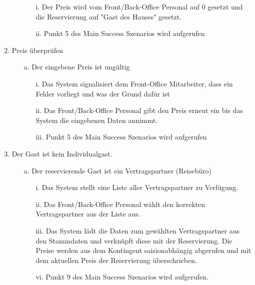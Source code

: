 \documentclass[./detailed_overview_usecases.tex]{subfiles}
\begin{document}
\begin{enumerate}
\begin{itemize}
                \begin{itemize}
                    \item[i.] Der Preis wird vom Front/Back-Office Personal auf 0 gesetzt und die Reservierung auf "Gast des Hauses" gesetzt.
                    \item[ii.] Punkt 5 des Main Success Szenarios wird aufgerufen
                \end{itemize}
            \end{itemize}
        \item Preis überprüfen
        \begin{itemize}
            \item[a.] Der eingebene Preis ist ungültig
            \begin{itemize}
                \item[i.] Das System signalisiert dem Front-Office Mitarbeiter, dass ein Fehler vorliegt und was der Grund dafür ist
                \item[ii.] Das Front/Back-Office Personal gibt den Preis erneut ein bis das System die eingebenen Daten annimmt.
                \item[iii.] Punkt 5 des Main Success Szenarios wird aufgerufen
            \end{itemize}
        \end{itemize}
        \setcounter{enumi}{7}
        \item Der Gast ist kein Individualgast.
        \begin{itemize}
            \item[a.] Der reservierende Gast ist ein Vertragspartner (Reisebüro)
                \begin{itemize}
                    \item[i.] Das System stellt eine Liste aller Vertragspartner zu Verfügung.
                    \item[ii.] Das Front/Back-Office Personal wählt den korrekten Vertragspartner aus der Liste aus.
                    \item[iii.] Das System lädt die Daten zum gewählten Vertragspartner aus den Stammdaten und verknüpft diese mit der Reservierung. Die Preise werden
                              aus dem Kontingent saisionabhängig abgerufen und mit dem aktuellen Preis der Reservierung überschrieben.
                    \item[vi.] Punkt 9 des Main Success Szenarios wird aufgerufen.
                \end{itemize}

\end{itemize}
\end{enumerate}
\end{document}
